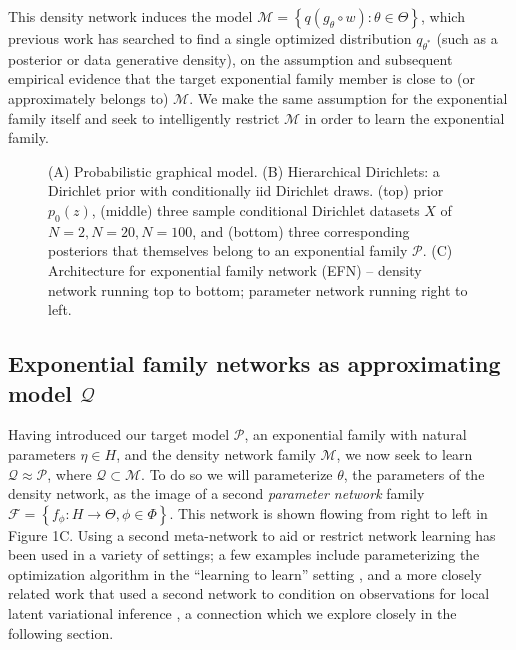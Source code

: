 \documentclass[twoside]{article}
\newcommand{\inputTikZ}[2]{%
     \scalebox{#1}{}  
}
\begin{document}
This density network induces the model $\mathcal{M} = \left\{ q(g_\theta \circ w) : \theta \in \Theta \right\}$, which previous work has searched to find a single optimized distribution $q_{\theta^*}$ (such as a posterior or data generative density), on the assumption and subsequent empirical evidence that the target exponential family member is close to (or approximately belongs to) $\mathcal{M}$.   We make the same assumption for the exponential family itself and seek to intelligently restrict $\mathcal{M}$ in order to learn the exponential family.  

\begin{figure}
 {\centering \inputTikZ{0.55}{figs/fig1/efn1b.tex}  }

  \caption{(A) Probabilistic graphical model. (B) Hierarchical Dirichlets: a Dirichlet prior with conditionally iid Dirichlet draws.  (top) prior $p_0(z)$, (middle) three sample conditional Dirichlet datasets $X$ of $N=2, N=20, N=100$, and (bottom) three corresponding posteriors that themselves belong to an exponential family $\mathcal{P}$.  (C) Architecture for exponential family network (EFN) -- density network running top to bottom; parameter network running right to left.}
\end{figure}

\subsection{Exponential family networks as approximating model $\mathcal{Q}$}

Having introduced our target model $\mathcal{P}$, an exponential family with natural parameters $\eta \in H$, and the density network family $\mathcal{M}$, we now seek to learn $\mathcal{Q} \approx \mathcal{P}$, where $\mathcal{Q} \subset \mathcal{M}$.  
To do so we will parameterize $\theta$, the parameters of the density network, as the image of a second \emph{parameter network} family $\mathcal{F} = \left\{ f_\phi : H \rightarrow \Theta, \phi \in \Phi\right\}$.   
This network is shown flowing from right to left in Figure 1C.  
Using a second meta-network to aid or restrict network learning has been used in a variety of settings; a few examples include parameterizing the optimization algorithm in the ``learning to learn'' setting \citep{andrychowicz2016learning}, and a more closely related work that used a second network to condition on observations for local latent variational inference \citep{rezende2015variational}, a connection which we explore closely in the following section.
\end{document}
